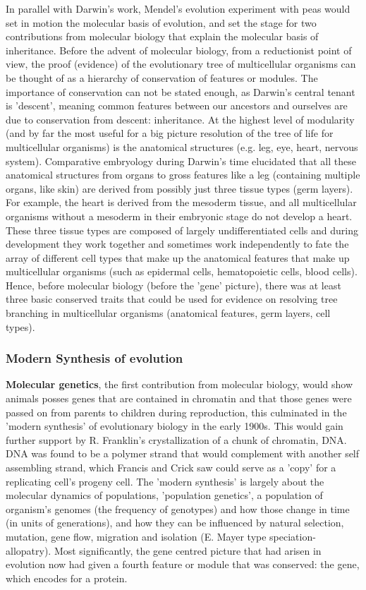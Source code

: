 In parallel with Darwin's work, Mendel's evolution experiment with peas would set in motion the molecular basis of evolution, and set the stage for two contributions from molecular biology that explain the molecular basis of inheritance.  Before the advent of molecular biology, from a reductionist point of view, the proof (evidence) of the evolutionary tree of multicellular organisms can be thought of as a hierarchy of conservation of features or modules.  The importance of conservation can not be stated enough, as Darwin's central tenant is 'descent', meaning common features between our ancestors and ourselves are due to conservation from descent: inheritance.  At the highest level of modularity (and by far the most useful for a big picture resolution of the tree of life for multicellular organisms) is the anatomical structures (e.g. leg, eye, heart, nervous system).  Comparative embryology during Darwin's time elucidated that all these anatomical structures from organs to gross features like a leg (containing multiple organs, like skin) are derived from possibly just three tissue types (germ layers).  For example, the heart is derived from the mesoderm tissue, and all multicellular organisms without a mesoderm in their embryonic stage do not develop a heart.  These three tissue types are composed of largely undifferentiated cells and during development they work together and sometimes work independently to fate the array of different cell types that make up the anatomical features that make up multicellular organisms (such as epidermal cells,  hematopoietic cells, blood cells).  Hence, before molecular biology (before the 'gene' picture), there was at least three basic conserved traits that could be used for evidence on resolving tree branching in multicellular organisms (anatomical features, germ layers, cell types).
    
\subsubsection{Modern Synthesis of evolution}

\textbf{Molecular genetics}, the first contribution from molecular biology, would show animals posses genes that are contained in chromatin and that those genes were passed on from parents to children during reproduction, this culminated in the 'modern synthesis' of evolutionary biology in the early 1900s.  This would gain further support by R. Franklin's crystallization of a chunk of chromatin, DNA.  DNA was found to be a polymer strand that would complement with another self assembling strand, which Francis and Crick saw could serve as a 'copy' for a replicating cell's progeny cell.  The 'modern synthesis' is largely about the molecular dynamics of populations, 'population genetics', a population of organism's genomes (the frequency of genotypes) and how those change in time (in units of generations), and how they can be influenced by natural selection, mutation, gene flow, migration and isolation (E. Mayer type speciation-allopatry).  Most significantly, the gene centred picture that had arisen in evolution now had given a fourth feature or module that was conserved: the gene, which encodes for a protein. 
